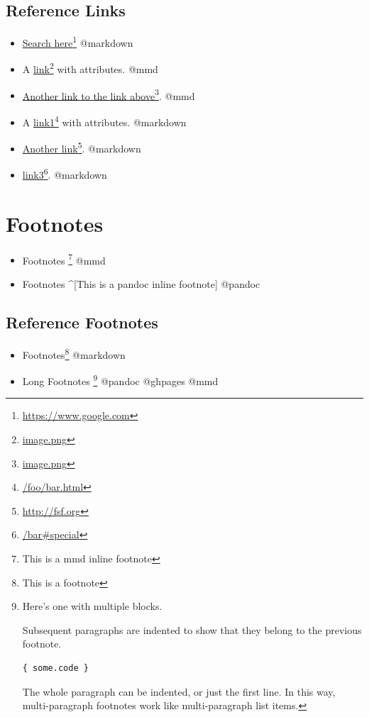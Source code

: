 \subsection{Reference Links}
\label{referencelinks}

\begin{itemize}
\item \href{https://www.google.com}{Search here}\footnote{\href{https://www.google.com}{https:/\slash www.google.com}} @markdown

\item A \href{image.png}{link}\footnote{\href{image.png}{image.png}} with attributes. @mmd

\item \href{image.png}{Another link to the link above}\footnote{\href{image.png}{image.png}}. @mmd

\item A \href{/foo/bar.html}{link1}\footnote{\href{/foo/bar.html}{\slash foo\slash bar.html}} with attributes. @markdown

\item \href{http://fsf.org}{Another link}\footnote{\href{http://fsf.org}{http:/\slash fsf.org}}. @markdown

\item \href{/bar#special}{link3}\footnote{\href{/bar\#special}{\slash bar\#special}}. @markdown

\end{itemize}

\section{Footnotes}
\label{footnotes}

\begin{itemize}
\item Footnotes \footnote{This is a mmd inline footnote} @mmd

\item Footnotes \^{}[This is a pandoc inline footnote] @pandoc

\end{itemize}

\subsection{Reference Footnotes}
\label{referencefootnotes}

\begin{itemize}
\item Footnotes\footnote{This is a footnote} @markdown

\item Long Footnotes \footnote{Here's one with multiple blocks.

Subsequent paragraphs are indented to show that they
belong to the previous footnote.

\begin{verbatim}
{ some.code }
\end{verbatim}

The whole paragraph can be indented, or just the first
line. In this way, multi-paragraph footnotes work like
multi-paragraph list items.} @pandoc @ghpages @mmd

\end{itemize}

